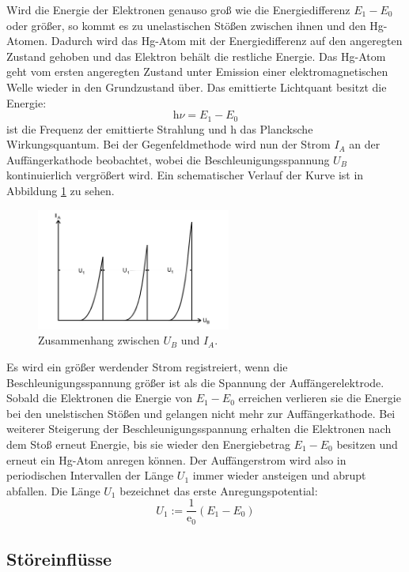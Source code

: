 Wird die Energie der Elektronen genauso groß wie die Energiedifferenz $E_1 -E_0$ oder größer, so kommt es zu unelastischen Stößen zwischen ihnen und den Hg-Atomen.
Dadurch wird das Hg-Atom mit der Energiedifferenz auf den angeregten Zustand gehoben und das Elektron behält die restliche Energie.
Das Hg-Atom geht vom ersten angeregten Zustand unter Emission einer elektromagnetischen Welle wieder in den Grundzustand über.
Das emittierte Lichtquant besitzt die Energie:
\begin{equation}
    \text{h} \nu = E_1 - E_0
    \label{eqn:gl3}
\end{equation}
\nu ist die Frequenz der emittierte Strahlung und h das Plancksche Wirkungsquantum.
Bei der Gegenfeldmethode wird nun der Strom $I_A$ an der Auffängerkathode beobachtet, wobei die Beschleunigungsspannung $U_B$ kontinuierlich vergrößert wird. 
Ein schematischer Verlauf der Kurve ist in Abbildung \ref{fig:abb2} zu sehen. 
\begin{figure}
    \centering
    \includegraphics[height=4.0cm]{data/abb2.jpg}
    \caption{Zusammenhang zwischen $U_B$ und $I_A$.  \cite{V601}}
    \label{fig:abb2}
\end{figure}
Es wird ein größer werdender Strom registreiert, wenn die Beschleunigungsspannung größer ist als die Spannung der Auffängerelektrode.
Sobald die Elektronen die Energie von $E_1 - E_0$ erreichen verlieren sie die Energie bei den unelstischen Stößen und gelangen nicht mehr zur Auffängerkathode.
Bei weiterer Steigerung der Beschleunigungsspannung erhalten die Elektronen nach dem Stoß erneut Energie, bis sie wieder den Energiebetrag $E_1 -E_0$ besitzen und erneut ein Hg-Atom anregen können.
Der Auffängerstrom wird also in periodischen Intervallen der Länge $U_1$ immer wieder ansteigen und abrupt abfallen. 
Die Länge $U_1$ bezeichnet das erste Anregungspotential:
\begin{equation}
    U_1 := \frac{1}{\text{e}_0}(E_1 - E_0)
    \label{eqn:gl4}
\end{equation}

\subsection{Störeinflüsse}
\label{Stoer}

